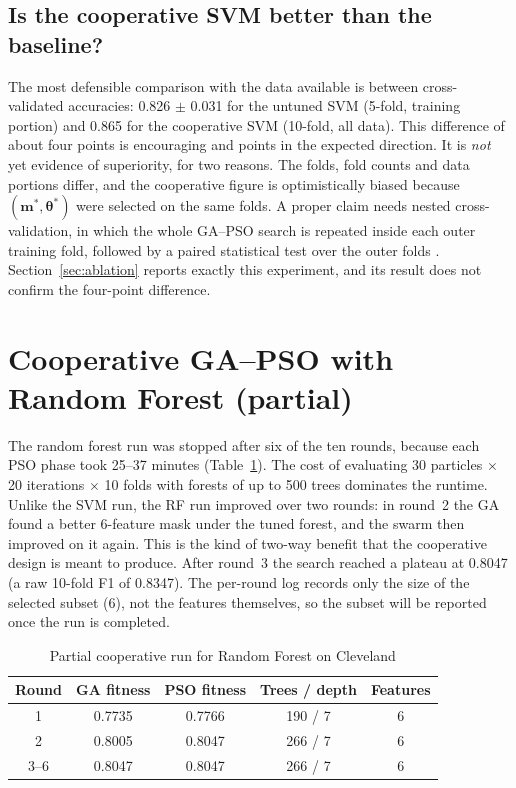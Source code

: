 \documentclass[MTech]{ugthesis}
\begin{document}
\subsection{Is the cooperative SVM better than the baseline?}
The most defensible comparison with the data available is between cross-validated accuracies: 0.826 $\pm$ 0.031 for the untuned SVM (5-fold, training portion) and 0.865 for the cooperative SVM (10-fold, all data). This difference of about four points is encouraging and points in the expected direction. It is \emph{not} yet evidence of superiority, for two reasons. The folds, fold counts and data portions differ, and the cooperative figure is optimistically biased because $(\mathbf{m}^{*},\boldsymbol{\theta}^{*})$ were selected on the same folds. A proper claim needs nested cross-validation, in which the whole GA--PSO search is repeated inside each outer training fold, followed by a paired statistical test over the outer folds \citep{demsar2006stats}. Section~\ref{sec:ablation} reports exactly this experiment, and its result does not confirm the four-point difference.

\section{Cooperative GA--PSO with Random Forest (partial)}
The random forest run was stopped after six of the ten rounds, because each PSO phase took 25--37 minutes (Table~\ref{tab:rf}). The cost of evaluating 30 particles $\times$ 20 iterations $\times$ 10 folds with forests of up to 500 trees dominates the runtime. Unlike the SVM run, the RF run improved over two rounds: in round~2 the GA found a better 6-feature mask under the tuned forest, and the swarm then improved on it again. This is the kind of two-way benefit that the cooperative design is meant to produce. After round~3 the search reached a plateau at 0.8047 (a raw 10-fold F1 of 0.8347). The per-round log records only the size of the selected subset (6), not the features themselves, so the subset will be reported once the run is completed.

\begin{table}[htpb]
\small
\renewcommand{\arraystretch}{1.25}
\caption{Partial cooperative run for Random Forest on Cleveland}
\label{tab:rf}
\begin{tabular}{|c|c|c|c|c|}
\hline
\textbf{Round} & \textbf{GA fitness} & \textbf{PSO fitness} & \textbf{Trees / depth} & \textbf{Features} \\ \hline
1 & 0.7735 & 0.7766 & 190 / 7 & 6 \\ \hline
2 & 0.8005 & 0.8047 & 266 / 7 & 6 \\ \hline
3--6 & 0.8047 & 0.8047 & 266 / 7 & 6 \\ \hline
\end{tabular}
\end{table}
\end{document}
